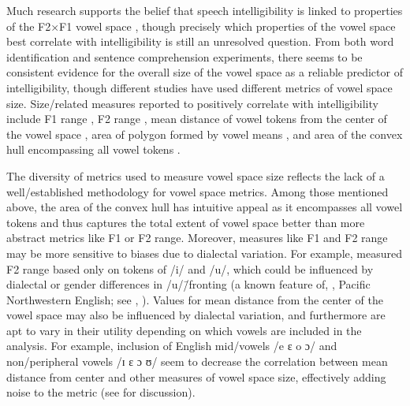 Much research supports the belief that speech intelligibility is linked to properties of the F2×F1 vowel space \citep[\eg,][]{BondMoore1994, BradlowEtAl1996, HazanMarkham2004, Neel2008, McCloyEtAl2013}, though precisely which properties of the vowel space best correlate with intelligibility is still an unresolved question.  From both word identification and sentence comprehension experiments, there seems to be consistent evidence for the overall size of the vowel space as a reliable predictor of intelligibility, though different studies have used different metrics of vowel space size.  Size\-/related measures reported to positively correlate with intelligibility include F1 range \citep{BradlowEtAl1996}, F2 range \citep{HazanMarkham2004}, mean distance of vowel tokens from the center of the vowel space \citep{BradlowEtAl1996}, area of polygon formed by vowel means \citep{BradlowEtAl1996, Neel2008, McCloyEtAl2012},\footnotemark{} and area of the convex hull encompassing all vowel tokens \citep{McCloyEtAl2013}.

The diversity of metrics used to measure vowel space size reflects the lack of a well\-/established methodology for vowel space metrics.  Among those mentioned above, the area of the convex hull has intuitive appeal as it encompasses all vowel tokens and thus captures the total extent of vowel space better than more abstract metrics like F1 or F2 range.  Moreover, measures like F1 and F2 range may be more sensitive to biases due to dialectal variation.  For example, \citeauthor*{HazanMarkham2004} measured F2 range based only on tokens of /i/ and /u/, which could be influenced by dialectal or gender differences in /u/\=/fronting (a known feature of, \eg, Pacific Northwestern English; see \citealt{Reed1952}, \citealt[ch. 4]{Ward2003}).  Values for mean distance from the center of the vowel space may also be influenced by dialectal variation, and furthermore are apt to vary in their utility depending on which vowels are included in the analysis.  For example, inclusion of English mid\-/vowels /e ɛ o ɔ/ and non\-/peripheral vowels /ɪ ɛ ɔ ʊ/ seem to decrease the correlation between mean distance from center and other measures of vowel space size, effectively adding noise to the metric (see \citealt{McCloyEtAl2013} for discussion).  

